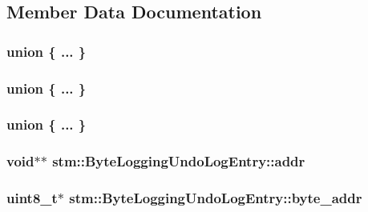 \subsection{Member Data Documentation}
\hypertarget{structstm_1_1ByteLoggingUndoLogEntry_a4d44a8c75fe904563855024724d5da96}{\subsubsection[{"@4}]{\setlength{\rightskip}{0pt plus 5cm}union \{ ... \} }}\label{structstm_1_1ByteLoggingUndoLogEntry_a4d44a8c75fe904563855024724d5da96}
\hypertarget{structstm_1_1ByteLoggingUndoLogEntry_aa9b32e26ef6e34a62ac88bcd0b307bbe}{\subsubsection[{"@6}]{\setlength{\rightskip}{0pt plus 5cm}union \{ ... \} }}\label{structstm_1_1ByteLoggingUndoLogEntry_aa9b32e26ef6e34a62ac88bcd0b307bbe}
\hypertarget{structstm_1_1ByteLoggingUndoLogEntry_ad6ca3d3ce87b6d9e0eb668889c313da6}{\subsubsection[{"@8}]{\setlength{\rightskip}{0pt plus 5cm}union \{ ... \} }}\label{structstm_1_1ByteLoggingUndoLogEntry_ad6ca3d3ce87b6d9e0eb668889c313da6}
\hypertarget{structstm_1_1ByteLoggingUndoLogEntry_add3c3d6f73859b45df061b3847939440}{
\subsubsection[{addr}]{\setlength{\rightskip}{0pt plus 5cm}void$\ast$$\ast$ stm\-::\-Byte\-Logging\-Undo\-Log\-Entry\-::addr}}\label{structstm_1_1ByteLoggingUndoLogEntry_add3c3d6f73859b45df061b3847939440}
\hypertarget{structstm_1_1ByteLoggingUndoLogEntry_a21b0197017fb1bcee1e3714bc9cc6841}{
\subsubsection[{byte\-\_\-addr}]{\setlength{\rightskip}{0pt plus 5cm}uint8\-\_\-t$\ast$ stm\-::\-Byte\-Logging\-Undo\-Log\-Entry\-::byte\-\_\-addr}}\label{structstm_1_1ByteLoggingUndoLogEntry_a21b0197017fb1bcee1e3714bc9cc6841}
